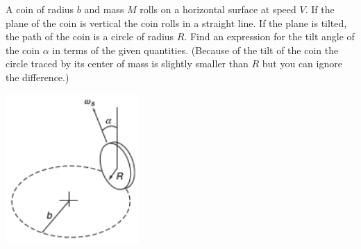\documentclass[12pt,letterpaper]{hmcpset}
\begin{document}
\begin{problem}
    A coin of radius $b$ and mass $M$ rolls on a 
    horizontal surface at speed $V$. If the plane of
    the coin is vertical the coin rolls in a straight
    line. If the plane is tilted, the path of the coin
    is a circle of radius $R$. Find an expression for
    the tilt angle of the coin $\alpha$ in terms of
    the given quantities. (Because of the tilt of the
    coin the circle traced by its center of mass is 
    slightly smaller than $R$ but you can ignore the 
    difference.)

    \begin{center}
        \includegraphics[width=2in]{img/8_6}
    \end{center}
\end{problem}
\begin{solution}
    \vfill
\end{solution}
\clearpage
\end{document}

